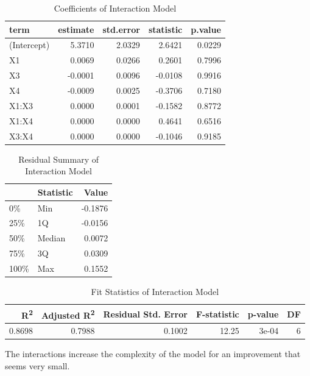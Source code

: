 \documentclass[
  11pt,
]{article}
\begin{document}
\begin{table}[!h]
\centering
\caption{\label{tab:unnamed-chunk-14}Coefficients of Interaction Model}
\centering
\fontsize{8}{10}\selectfont
\begin{tabular}[t]{lrrrr}
\toprule
term & estimate & std.error & statistic & p.value\\
\midrule
(Intercept) & 5.3710 & 2.0329 & 2.6421 & 0.0229\\
X1 & 0.0069 & 0.0266 & 0.2601 & 0.7996\\
X3 & -0.0001 & 0.0096 & -0.0108 & 0.9916\\
X4 & -0.0009 & 0.0025 & -0.3706 & 0.7180\\
X1:X3 & 0.0000 & 0.0001 & -0.1582 & 0.8772\\
\addlinespace
X1:X4 & 0.0000 & 0.0000 & 0.4641 & 0.6516\\
X3:X4 & 0.0000 & 0.0000 & -0.1046 & 0.9185\\
\bottomrule
\end{tabular}
\end{table}
\begin{table}[!h]
\centering
\caption{\label{tab:unnamed-chunk-15}Residual Summary of Interaction Model}
\centering
\fontsize{8}{10}\selectfont
\begin{tabular}[t]{llr}
\toprule
  & Statistic & Value\\
\midrule
0\% & Min & -0.1876\\
25\% & 1Q & -0.0156\\
50\% & Median & 0.0072\\
75\% & 3Q & 0.0309\\
100\% & Max & 0.1552\\
\bottomrule
\end{tabular}
\end{table}

\begin{table}[!h]
\centering
\caption{\label{tab:unnamed-chunk-16}Fit Statistics of Interaction Model}
\centering
\fontsize{8}{10}\selectfont
\begin{tabular}[t]{rrrrrr}
\toprule
R\textsuperscript{2} & Adjusted R\textsuperscript{2} & Residual Std. Error & F-statistic & p-value & DF\\
\midrule
0.8698 & 0.7988 & 0.1002 & 12.25 & 3e-04 & 6\\
\bottomrule
\end{tabular}
\end{table}

The interactions increase the complexity of the model for an improvement
that seems very small.
\end{document}
